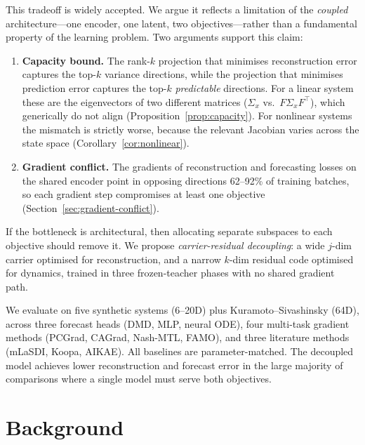 \documentclass{article}
\begin{document}
This tradeoff is widely accepted.  We argue it reflects a limitation
of the \emph{coupled} architecture---one encoder, one latent, two
objectives---rather than a fundamental property of the learning
problem.  Two arguments support this claim:
\begin{enumerate}
\item \textbf{Capacity bound.}  The rank-$k$ projection that
minimises reconstruction error captures the top-$k$ variance
directions, while the projection that minimises prediction error
captures the top-$k$ \emph{predictable} directions.
For a linear system these are the eigenvectors of two different
matrices ($\Sigma_x$ vs.\ $F\Sigma_x F^\top$), which generically
do not align (Proposition~\ref{prop:capacity}).  For nonlinear
systems the mismatch is strictly worse, because the relevant
Jacobian varies across the state space
(Corollary~\ref{cor:nonlinear}).
\item \textbf{Gradient conflict.}  The gradients of reconstruction
and forecasting losses on the shared encoder point in opposing
directions 62--92\% of training batches, so each gradient step
compromises at least one objective
(Section~\ref{sec:gradient-conflict}).
\end{enumerate}
If the bottleneck is architectural, then allocating separate subspaces
to each objective should remove it.  We propose \emph{carrier-residual
decoupling}: a wide $j$-dim carrier optimised for reconstruction,
and a narrow $k$-dim residual code optimised for dynamics, trained
in three frozen-teacher phases with no shared gradient path.

We evaluate on five synthetic systems (6--20D) plus
Kuramoto--Sivashinsky (64D), across three forecast heads (DMD, MLP,
neural ODE), four multi-task gradient methods (PCGrad, CAGrad,
Nash-MTL, FAMO), and three literature methods (mLaSDI, Koopa, AIKAE).
All baselines are parameter-matched.  The decoupled model
achieves lower reconstruction and forecast error in the large
majority of comparisons where a single model must serve both
objectives.


\section{Background}
\label{sec:background}
\end{document}
